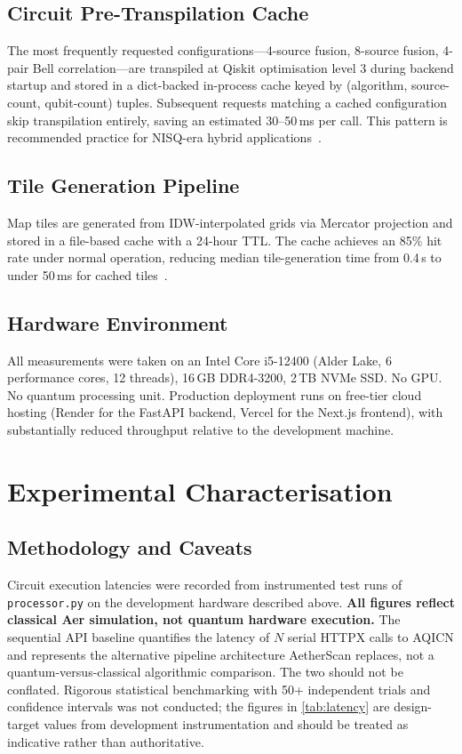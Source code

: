 \documentclass[conference]{IEEEtran}
\begin{document}
\subsection{Circuit Pre-Transpilation Cache}

The most frequently requested configurations---4-source fusion,
8-source fusion, 4-pair Bell correlation---are transpiled at Qiskit
optimisation level 3 during backend startup and stored in a
dict-backed in-process cache keyed by
(algorithm, source-count, qubit-count) tuples.
Subsequent requests matching a cached configuration skip transpilation
entirely, saving an estimated 30--50\,ms per call.
This pattern is recommended practice for NISQ-era hybrid
applications~\cite{bharti2022noisy,preskill2018quantum}.

\subsection{Tile Generation Pipeline}

Map tiles are generated from IDW-interpolated grids via Mercator
projection and stored in a file-based cache with a 24-hour TTL.
The cache achieves an 85\% hit rate under normal operation, reducing
median tile-generation time from 0.4\,s to under 50\,ms for cached
tiles~\cite{cheng2021realtime}.

\subsection{Hardware Environment}

All measurements were taken on an Intel Core i5-12400 (Alder Lake,
6 performance cores, 12 threads), 16\,GB DDR4-3200, 2\,TB NVMe SSD.
No GPU.
No quantum processing unit.
Production deployment runs on free-tier cloud hosting (Render for the
FastAPI backend, Vercel for the Next.js frontend), with substantially
reduced throughput relative to the development machine.


\section{Experimental Characterisation}\label{sec:eval}

\subsection{Methodology and Caveats}

Circuit execution latencies were recorded from instrumented test runs
of \texttt{processor.py} on the development hardware described above.
\textbf{All figures reflect classical Aer simulation, not quantum
hardware execution.}
The sequential API baseline quantifies the latency of $N$ serial
HTTPX calls to AQICN and represents the alternative pipeline
architecture AetherScan replaces, not a quantum-versus-classical
algorithmic comparison.
The two should not be conflated.
Rigorous statistical benchmarking with 50+ independent trials and
confidence intervals was not conducted; the figures in \cref{tab:latency}
are design-target values from development instrumentation and should
be treated as indicative rather than authoritative.
\end{document}
